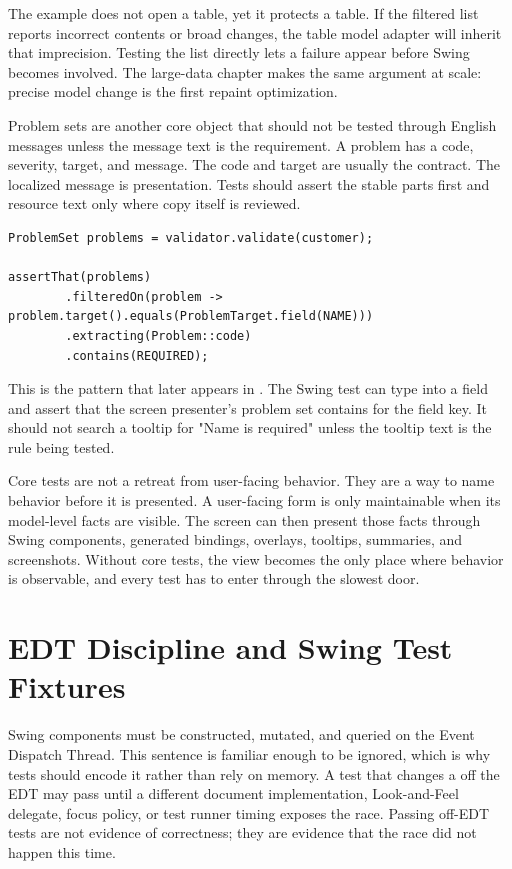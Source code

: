 The example does not open a table, yet it protects a table. If the filtered list reports incorrect contents or broad changes, the table model adapter will inherit that imprecision. Testing the list directly lets a failure appear before Swing becomes involved. The large-data chapter makes the same argument at scale: precise model change is the first repaint optimization.

Problem sets are another core object that should not be tested through English messages unless the message text is the requirement. A problem has a code, severity, target, and message. The code and target are usually the contract. The localized message is presentation. Tests should assert the stable parts first and resource text only where copy itself is reviewed.

\begin{lstlisting}[caption={Testing problems by code and target.}]
ProblemSet problems = validator.validate(customer);

assertThat(problems)
        .filteredOn(problem -> problem.target().equals(ProblemTarget.field(NAME)))
        .extracting(Problem::code)
        .contains(REQUIRED);
\end{lstlisting}

This is the pattern that later appears in . The Swing test can type into a field and assert that the screen presenter's problem set contains  for the  field key. It should not search a tooltip for "Name is required" unless the tooltip text is the rule being tested.

Core tests are not a retreat from user-facing behavior. They are a way to name behavior before it is presented. A user-facing form is only maintainable when its model-level facts are visible. The screen can then present those facts through Swing components, generated bindings, overlays, tooltips, summaries, and screenshots. Without core tests, the view becomes the only place where behavior is observable, and every test has to enter through the slowest door.

\section{EDT Discipline and Swing Test Fixtures}

Swing components must be constructed, mutated, and queried on the Event Dispatch Thread. This sentence is familiar enough to be ignored, which is why tests should encode it rather than rely on memory. A test that changes a  off the EDT may pass until a different document implementation, Look-and-Feel delegate, focus policy, or test runner timing exposes the race. Passing off-EDT tests are not evidence of correctness; they are evidence that the race did not happen this time.


